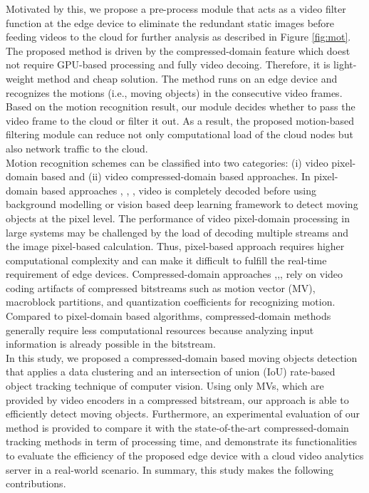  Motivated by this, we propose a pre-process module that acts as a video filter function at the edge device to eliminate the redundant static images before feeding videos to the cloud for further analysis as described in Figure \ref{fig:mot}. The proposed method is driven by the compressed-domain feature which doest not require GPU-based processing and fully video decoing. Therefore, it is light-weight method and cheap solution. The  method runs on an edge device and recognizes the motions (i.e., moving objects) in the consecutive video frames. Based on the motion recognition result, our module decides whether to pass the video frame to the cloud or filter it out. As a result, the proposed motion-based filtering module can reduce not only computational load of the cloud nodes but also network traffic to the cloud. \\
Motion recognition schemes can be classified into two categories: (i) video pixel-domain based and (ii) video compressed-domain based approaches. In pixel-domain based approaches \cite{lu2014moving}, \cite{kumar2016segmentation}, \cite{gujrathi2014detecting}, \cite{wang2019ground} video is completely decoded before using background modelling or vision based deep learning framework to detect moving objects at the pixel level. The performance of video pixel-domain processing in large systems may be challenged by the load of decoding multiple streams and the image pixel-based calculation. Thus, pixel-based approach requires higher computational complexity and can make it difficult to fulfill the real-time requirement of edge devices. 
Compressed-domain approaches \cite{favalli2000object},\cite{yoneyama1999moving},\cite{dong2006object},\cite{achanta2002compressed} rely on video coding artifacts of compressed bitstreams such as motion vector (MV), macroblock partitions, and quantization coefficients for recognizing motion. Compared to pixel-domain based algorithms, compressed-domain methods generally require less computational resources because analyzing input information is already possible in the bitstream.\\ In this study, we proposed a compressed-domain based moving objects detection that applies a data clustering and an intersection of union (IoU) rate-based object tracking technique of computer vision. Using only MVs, which are provided by video encoders in a compressed bitstream, our approach is able to efficiently detect moving objects. Furthermore, an experimental evaluation of our method is provided to compare it with the state-of-the-art compressed-domain tracking methods in term of processing time, and demonstrate its functionalities to evaluate the efficiency of the proposed edge device with a cloud video analytics server in a real-world scenario. In summary, this study makes the following contributions.
